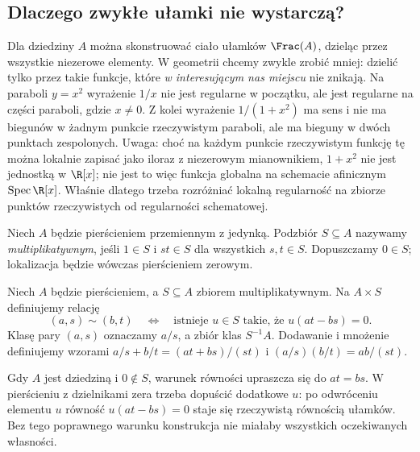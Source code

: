 \subsection{Dlaczego zwykłe ułamki nie wystarczą?}
Dla dziedziny $A$ można skonstruować ciało ułamków $\Frac(A)$,
dzieląc przez wszystkie niezerowe elementy. W geometrii chcemy zwykle
zrobić mniej: dzielić tylko przez takie funkcje, które \emph{w
interesującym nas miejscu} nie znikają. Na paraboli $y=x^2$
wyrażenie $1/x$ nie jest regularne w początku, ale jest regularne
na części paraboli, gdzie $x\ne0$. Z kolei wyrażenie $1/(1+x^2)$ ma sens i nie ma biegunów
w żadnym punkcie rzeczywistym paraboli, ale ma bieguny w dwóch
punktach zespolonych. Uwaga: choć na każdym punkcie
rzeczywistym funkcję tę można lokalnie zapisać jako iloraz
z niezerowym mianownikiem, $1+x^2$ nie jest jednostką w
$\R[x]$; nie jest to więc funkcja globalna na schemacie
afinicznym $\operatorname{Spec}\R[x]$. Właśnie dlatego
trzeba rozróżniać lokalną regularność na zbiorze punktów
rzeczywistych od regularności schematowej.

\begin{definicja}
Niech $A$ będzie pierścieniem przemiennym z jedynką.
Podzbiór $S\subseteq A$ nazywamy \emph{multiplikatywnym},
jeśli $1\in S$ i $st\in S$ dla wszystkich $s,t\in S$.
Dopuszczamy $0\in S$; lokalizacja będzie wówczas pierścieniem zerowym.
\end{definicja}

\begin{definicja}[Lokalizacja]
\label{def:loc}
Niech $A$ będzie pierścieniem, a $S\subseteq A$ zbiorem
multiplikatywnym. Na $A\times S$ definiujemy relację
\[
(a,s)\sim(b,t) \quad\Longleftrightarrow\quad
\text{istnieje }u\in S\text{ takie, że }u(at-bs)=0.
\]
Klasę pary $(a,s)$ oznaczamy $a/s$, a zbiór klas $S^{-1}A$.
Dodawanie i mnożenie definiujemy wzorami
$a/s+b/t=(at+bs)/(st)$ i $(a/s)(b/t)=ab/(st)$.
\end{definicja}

\begin{uwaga}[Po co czynnik $u$?]
Gdy $A$ jest dziedziną i $0\notin S$, warunek równości
upraszcza się do $at=bs$. W pierścieniu z dzielnikami zera
trzeba dopuścić dodatkowe $u$: po odwróceniu elementu $u$
równość $u(at-bs)=0$ staje się rzeczywistą równością
ułamków. Bez tego poprawnego warunku konstrukcja nie
miałaby wszystkich oczekiwanych własności.
\end{uwaga}

